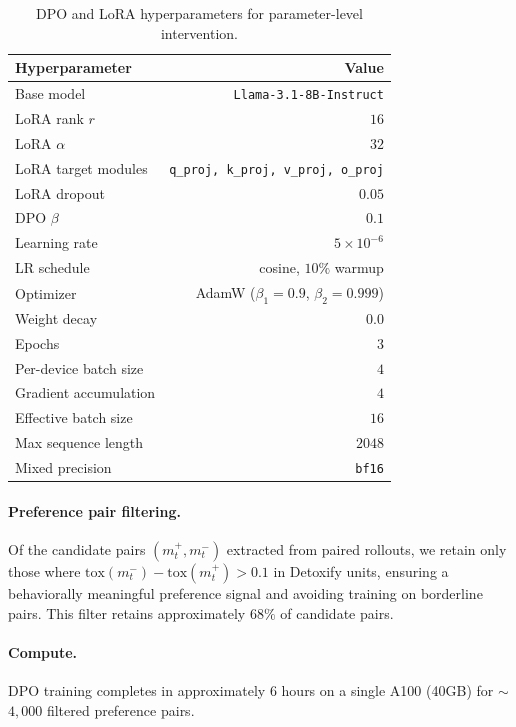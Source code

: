 \begin{table}[ht]
\centering
\sffamily
\small
\caption{DPO and LoRA hyperparameters for parameter-level intervention.}
\label{tab:dpo_hparams}
\begin{tabular}{lr}
\toprule
Hyperparameter & Value \\
\midrule
Base model & \texttt{Llama-3.1-8B-Instruct} \\
LoRA rank $r$ & $16$ \\
LoRA $\alpha$ & $32$ \\
LoRA target modules & \texttt{q\_proj, k\_proj, v\_proj, o\_proj} \\
LoRA dropout & $0.05$ \\
DPO $\beta$ & $0.1$ \\
Learning rate & $5 \times 10^{-6}$ \\
LR schedule & cosine, $10\%$ warmup \\
Optimizer & AdamW ($\beta_1{=}0.9$, $\beta_2{=}0.999$) \\
Weight decay & $0.0$ \\
Epochs & $3$ \\
Per-device batch size & $4$ \\
Gradient accumulation & $4$ \\
Effective batch size & $16$ \\
Max sequence length & $2048$ \\
Mixed precision & \texttt{bf16} \\
\bottomrule
\end{tabular}
\end{table}

\paragraph{Preference pair filtering.}
Of the candidate pairs $(m_t^{+}, m_t^{-})$ extracted from paired rollouts, we retain only those where $\mathrm{tox}(m_t^{-}) - \mathrm{tox}(m_t^{+}) > 0.1$ in Detoxify units, ensuring a behaviorally meaningful preference signal and avoiding training on borderline pairs.
This filter retains approximately $68\%$ of candidate pairs.

\paragraph{Compute.}
DPO training completes in approximately $6$ hours on a single A100 (40GB) for $\sim$$4{,}000$ filtered preference pairs.



